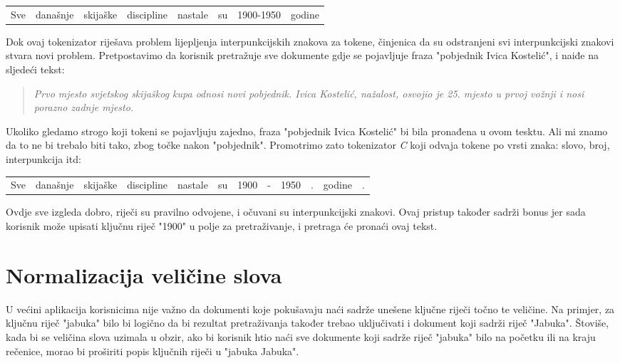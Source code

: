 \documentclass[11pt]{scrreprt}
\begin{document}
\begin{center}
  \begin{tabular}{cccccccc}
    Sve & današnje & skijaške & discipline & nastale & su & 1900-1950 & godine
  \end{tabular}
\end{center}

Dok ovaj tokenizator riješava problem lijepljenja interpunkcijskih znakova za tokene, činjenica da su odstranjeni svi interpunkcijski znakovi stvara novi problem. Pretpostavimo da korisnik pretražuje sve dokumente gdje se pojavljuje fraza "pobjednik Ivica Kostelić", i naiđe na sljedeći tekst:

\begin{quote}
  \textit{Prvo mjesto svjetskog skijaškog kupa odnosi novi pobjednik. Ivica Kostelić, nažalost, osvojio je 25. mjesto u prvoj vožnji i nosi porazno zadnje mjesto.}
\end{quote}

Ukoliko gledamo strogo koji tokeni se pojavljuju zajedno, fraza "pobjednik Ivica Kostelić" bi bila pronađena u ovom tesktu. Ali mi znamo da to ne bi trebalo biti tako, zbog točke nakon "pobjednik". Promotrimo zato tokenizator \textit{C} koji odvaja tokene po vrsti znaka: slovo, broj, interpunkcija itd:

\begin{center}
  \begin{tabular}{cccccccccccc}
    Sve & današnje & skijaške & discipline & nastale & su & 1900 & - & 1950 & . & godine & .
  \end{tabular}
\end{center}

Ovdje sve izgleda dobro, riječi su pravilno odvojene, i očuvani su interpunkcijski znakovi. Ovaj pristup također sadrži bonus jer sada korisnik može upisati ključnu riječ "1900" u polje za pretraživanje, i pretraga će pronaći ovaj tekst.

\section{Normalizacija veličine slova}

U većini aplikacija korisnicima nije važno da dokumenti koje pokušavaju naći sadrže unešene ključne riječi točno te veličine. Na primjer, za ključnu riječ "jabuka" bilo bi logično da bi rezultat pretraživanja također trebao uključivati i dokument koji sadrži riječ "Jabuka". Štoviše, kada bi se veličina slova uzimala u obzir, ako bi korisnik htio naći sve dokumente koji sadrže riječ "jabuka" bilo na početku ili na kraju rečenice, morao bi proširiti popis ključnih riječi u "jabuka Jabuka".
\end{document}
